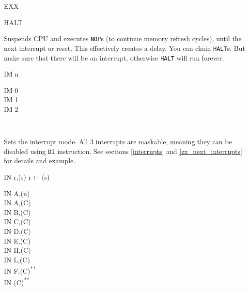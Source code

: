 \documentclass[12pt,twoside,openright,a4paper]{book}
\newcommand{\UNDOC}{\textnormal{\textsuperscript{**}}}
\begin{document}
\begin{basedescript}{
	\desclabelstyle{\multilinelabel}
	\desclabelwidth{3cm}}
\begin{detailitem}{EXX}
	\end{detailitem}

	\begin{detailitem}{HALT}
		{}

		Suspends CPU and executes {\tt NOP}s (to continue memory refresh cycles), until the next interrupt or reset. This effectively creates a delay. You can chain {\tt HALT}s. But make sure that there will be an interrupt, otherwise {\tt HALT} will run forever.

		\DetailNoEffect
						
		\begin{DetailTiming}
		\end{DetailTiming}

	\end{detailitem}

	\begin{detailitem}{IM n}
		{}

		\begin{DetailVariants}[1]
			IM 0\\
			IM 1\\
			IM 2
			
			\columnbreak
			~
		\end{DetailVariants}

		Sets the interrupt mode. All 3 interrupts are maskable, meaning they can be disabled using {\tt DI} instruction. See sections \ref{interrupts} and \ref{zx_next_interrupts} for details and example.

		\DetailNoEffect		

		\begin{DetailTiming}
			\DetailTime{}{2}{8}
		\end{DetailTiming}

	\end{detailitem}

	\pagebreak
	\begin{detailitem}{IN r,(s)}
		{r$\leftarrow$(s)}

		\begin{DetailVariants}
			IN A,(n)\\
			IN A,(C)\\
			IN B,(C)\\
			IN C,(C)\\
			IN D,(C)\\
			IN E,(C)\\
			IN H,(C)\\
			IN L,(C)\\
			IN F,(C)\UNDOC\\
			IN (C)\UNDOC
		\end{DetailVariants}


\end{detailitem}
\end{basedescript}
\end{document}
